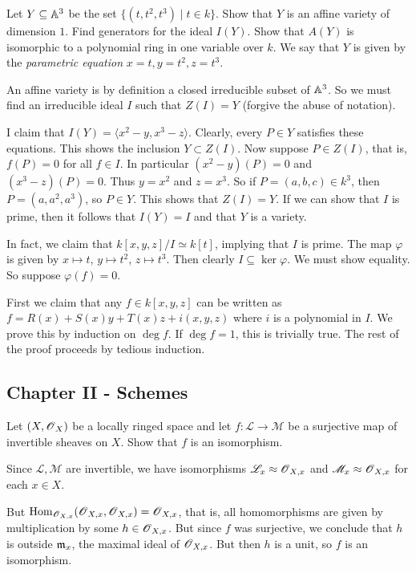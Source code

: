 \documentclass[11pt, english]{article}
\begin{document}
\begin{exc}

Let $Y \subseteq \mathbb{A}^3$ be the set $\{ (t,t^2,t^3) \mid t \in k\}$. Show that $Y$ is an affine variety of dimension $1$. Find generators for the ideal $I(Y)$. Show that $A(Y)$ is isomorphic to a polynomial ring in one variable over $k$. We say that $Y$ is given by the \emph{parametric equation} $x=t,y=t^2,z=t^3$.  
\end{exc}
\begin{sol}
An affine variety is by definition a closed irreducible subset of $\mathbb{A}^3$. So we must find an irreducible ideal $I$ such that $Z(I)=Y$ (forgive the abuse of notation).

I claim that $I(Y)=\langle x^2-y,x^3-z \rangle$. Clearly, every $P \in Y$ satisfies these equations. This shows the inclusion $Y \subset Z(I)$. Now suppose $P \in Z(I)$, that is, $f(P)=0$ for all $f \in I$. In particular $(x^2-y)(P)=0$ and $(x^3-z)(P)=0$. Thus $y=x^2$ and $z=x^3$. So if $P=(a,b,c) \in k^3$, then $P=(a,a^2,a^3)$, so $P \in Y$. This shows that $Z(I)=Y$. If we can show that $I$ is prime, then it follows that $I(Y)=I$ and that $Y$ is a variety.

In fact, we claim that $k[x,y,z]/I \simeq k[t]$, implying that $I$ is prime. The map $\varphi$ is given by $x \mapsto t$, $y \mapsto t^2$, $z \mapsto t^3$. Then clearly $I \subseteq \ker \varphi$. We must show equality. So suppose $\varphi(f)=0$. 

First we claim that any $f \in k[x,y,z]$ can be written as $f=R(x)+S(x)y+T(x)z+i(x,y,z)$ where $i$ is a polynomial in $I$. We prove this by induction on $\deg f$. If $\deg f = 1$, this is trivially true.  The rest of the proof proceeds by tedious induction.
\end{sol}

\subsection{Chapter II - Schemes}

\begin{exc}[Excercise 7.1]
Let $(X,\operatorname{\mathscr{O}}_X)$ be a locally ringed space and let $f:\mathscr L \to \mathscr M$ be a surjective map of invertible sheaves on $X$. Show that $f$ is an isomorphism.  
\end{exc}
\begin{sol}
Since $\mathscr L, \mathscr M$ are invertible, we have isomorphisms $\mathscr L_x \approx \operatorname{\mathscr{O}}_{X,x}$ and $\mathscr M_x \approx \operatorname{\mathscr{O}}_{X,x}$ for each $x \in X$.

But $\operatorname{Hom}_{\operatorname{\mathscr{O}}_{X,x}}(\operatorname{\mathscr{O}}_{X,x},\operatorname{\mathscr{O}}_{X,x})=\operatorname{\mathscr{O}}_{X,x}$, that is, all homomorphisms are given by multiplication by some $h \in \operatorname{\mathscr{O}}_{X,x}$. But since $f$ was surjective, we conclude that $h$ is outside $\mathfrak{m}_x$, the maximal ideal of $\operatorname{\mathscr{O}}_{X,x}$. But then $h$ is a unit, so $f$ is an isomorphism.
\end{sol}
\end{document}
